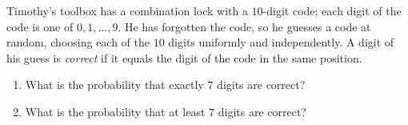 Timothy's toolbox has a combination lock with a $10$-digit code; each digit of the code is one of $0,1,\dots,9$. He has forgotten the code, so he guesses a code at random, choosing each of the $10$ digits uniformly and independently. A digit of his guess is \emph{correct} if it equals the digit of the code in the same position.
\begin{enumerate}
\item[(a)] What is the probability that exactly $7$ digits are correct?
\item[(b)] What is the probability that at least $7$ digits are correct?
\end{enumerate}
